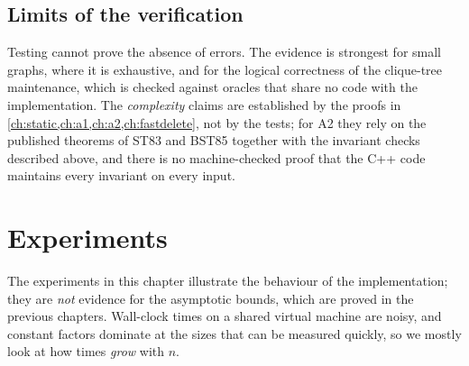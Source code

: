 \documentclass[11pt,a4paper,oneside]{report}
\theoremstyle{plain}
\theoremstyle{definition}
\theoremstyle{remark}
\begin{document}
\section{Limits of the verification}
Testing cannot prove the absence of errors. The evidence is strongest for small graphs, where
it is exhaustive, and for the logical correctness of the clique-tree maintenance, which is
checked against oracles that share no code with the implementation. The \emph{complexity}
claims are established by the proofs in \cref{ch:static,ch:a1,ch:a2,ch:fastdelete},
not by the tests; for A2 they rely on the published theorems of ST83 and BST85 together with
the invariant checks described above, and there is no machine-checked proof that the C++ code
maintains every invariant on every input.
\chapter{Experiments}\label{ch:experiments}

The experiments in this chapter illustrate the behaviour of the implementation; they are
\emph{not} evidence for the asymptotic bounds, which are proved in the previous chapters.
Wall-clock times on a shared virtual machine are noisy, and constant factors dominate at the
sizes that can be measured quickly, so we mostly look at how times \emph{grow} with \(n\).
\end{document}
